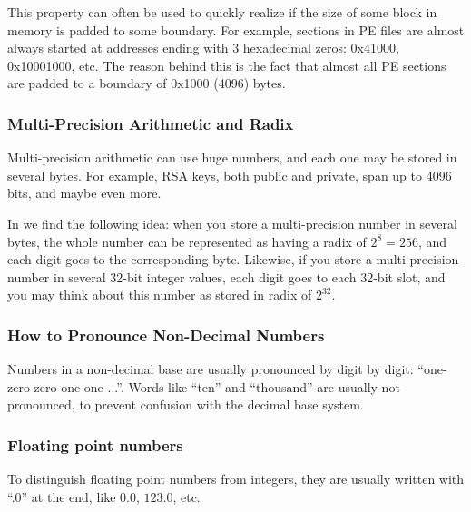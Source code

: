 This property can often be used to quickly realize if the size of some block in memory is padded to some boundary.
For example, sections in \ac{PE} files are almost always started at addresses ending with 3 hexadecimal zeros: 0x41000, 0x10001000, etc.
The reason behind this is the fact that almost all \ac{PE} sections are padded to a boundary of 0x1000 (4096) bytes.

\subsubsection{Multi-Precision Arithmetic and Radix}

Multi-precision arithmetic can use huge numbers, and each one may be stored in several bytes.
For example, RSA keys, both public and private, span up to 4096 bits, and maybe even more.

In  we find the following idea: when you store a multi-precision number in several bytes,
the whole number can be represented as having a radix of $2^8=256$, and each digit goes to the corresponding byte.
Likewise, if you store a multi-precision number in several 32-bit integer values, each digit goes to each 32-bit slot,
and you may think about this number as stored in radix of $2^{32}$.

\subsubsection{How to Pronounce Non-Decimal Numbers}

Numbers in a non-decimal base are usually pronounced by digit by digit: ``one-zero-zero-one-one-...''.
Words like ``ten'' and ``thousand'' are usually not pronounced, to prevent confusion with the decimal base system.

\subsubsection{Floating point numbers}

To distinguish floating point numbers from integers, they are usually written with ``.0'' at the end,
like $0.0$, $123.0$, etc.
